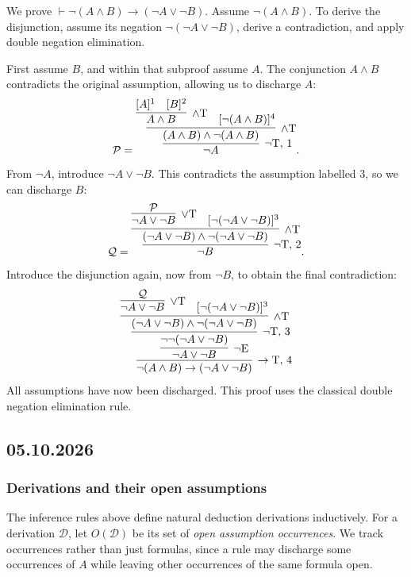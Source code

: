 \documentclass[11pt,a4paper]{amsart}
\begin{document}
\begin{example}
  We prove \(\vdash\neg(A\land B)\to(\neg A\lor\neg B)\).
  Assume \(\neg(A\land B)\). To derive the disjunction, assume its
  negation \(\neg(\neg A\lor\neg B)\), derive a contradiction, and
  apply double negation elimination.

  First assume \(B\), and within that subproof assume \(A\). The
  conjunction \(A\land B\) contradicts the original assumption,
  allowing us to discharge \(A\):
  \[
    \mathcal P =
    \infer[\neg\mathrm T,\,1]{\neg A}{
      \infer[\land\mathrm T]{(A\land B)\land\neg(A\land B)}{
        \infer[\land\mathrm T]{A\land B}{[A]^1 & [B]^2}
    & [\neg(A\land B)]^4}}.
  \]
  From \(\neg A\), introduce \(\neg A\lor\neg B\). This contradicts
  the assumption labelled \(3\), so we can discharge \(B\):
  \[
    \mathcal Q =
    \infer[\neg\mathrm T,\,2]{\neg B}{
      \infer[\land\mathrm T]
      {(\neg A\lor\neg B)\land\neg(\neg A\lor\neg B)}{
        \infer[\lor\mathrm T]{\neg A\lor\neg B}{\mathcal P}
    & [\neg(\neg A\lor\neg B)]^3}}.
  \]
  Introduce the disjunction again, now from \(\neg B\), to obtain the
  final contradiction:
  \[
    \infer[\to\mathrm T,\,4]{\neg(A\land B)\to(\neg A\lor\neg B)}{
      \infer[\neg\mathrm E]{\neg A\lor\neg B}{
        \infer[\neg\mathrm T,\,3]{\neg\neg(\neg A\lor\neg B)}{
          \infer[\land\mathrm T]
          {(\neg A\lor\neg B)\land\neg(\neg A\lor\neg B)}{
            \infer[\lor\mathrm T]{\neg A\lor\neg B}{\mathcal Q}
    & [\neg(\neg A\lor\neg B)]^3}}}}
  \]
  All assumptions have now been discharged. This proof uses the
  classical double negation elimination rule.
\end{example}

\subsection{05.10.2026}

\subsubsection{Derivations and their open assumptions}

The inference rules above define natural deduction derivations inductively.
For a derivation \(\mathcal D\), let \(O(\mathcal D)\) be its set of
\emph{open assumption occurrences}. We track occurrences rather than just
formulas, since a rule may discharge some occurrences of \(A\) while leaving
other occurrences of the same formula open.
\end{document}
